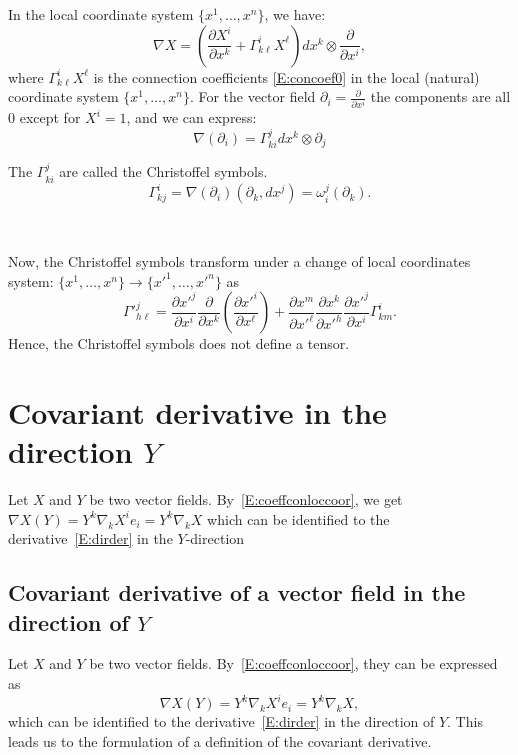In the  local coordinate system $\{x^{1},\dots,x^{n}\}$, we have:
\begin{equation}\label{E:coeffconloccoor}
\nabla X= \left( \frac{\partial X^{i} }{\partial x^{k}}+\Gamma^{i}_{k\ell}X^{\ell} \right) d x^{k} \otimes \frac{\partial}{\partial x^{i}},
\end{equation}
where  $\Gamma^{i}_{k\ell}X^{\ell}$ is the connection coefficients \eqref{E:concoef0} in the local (natural) coordinate system $\{x^{1},\dots,x^{n}\}$. For the vector field $ \partial_i=\frac{\partial}{\partial x^i}$ the components are all $0$ except for $X^i=1$, and we can express: 
\[
\nabla(\partial_i)= \Gamma^{j}_{ki} dx^k\otimes \partial_j
\]

\begin{definition}
The $\Gamma^{j}_{ki}$ are called the Christoffel symbols.
\begin{equation}
\Gamma^{i}_{kj} =
\nabla(\partial_{i})(\partial_{k},dx^{j})=\omega^{j}_{i}(\partial_{k}).
\end{equation}
\end{definition}

\,   

Now, the Christoffel symbols transform under a change of local coordinates system: $\{x^{1},\dots,x^{n}\}\to \{{x'}^{1},\dots,{x'}^{n}\}$ as
\begin{equation}
{\Gamma'}^{j}_{h\ell}= \frac{\partial{x'}^{j}}{\partial x^{i}}  \frac{\partial}{\partial x^{k}} \left(  \frac{\partial{x'}^{i}}{\partial x^{\ell}}\right) +     \frac{\partial x^{m}}{\partial {x'}^{\ell}} \frac{\partial x^{k}}{\partial{x'}^{h}} \frac{\partial{x'}^{j}}{\partial x^{i}} \Gamma^{i}_{k m}.
\end{equation}
Hence, the Christoffel symbols does not define a tensor.

\section{Covariant derivative  in the direction $Y$}
Let $X$ and $Y$ be two vector fields. By~\eqref{E:coeffconloccoor}, we get $\nabla X(Y)=Y^{k}\nabla_{k}X^{i}e_{i}=Y^{k} \nabla_{k}X$ which can be identified to the  derivative~\eqref{E:dirder} in the $Y$-direction  

\subsection{\bf Covariant derivative of a vector field in the direction of $Y$}
Let $X$ and $Y$ be two vector fields. By~\eqref{E:coeffconloccoor}, they can be expressed as $$\nabla X(Y)=Y^{k}\nabla_{k}X^{i}e_{i}=Y^{k} \nabla_{k}X,$$ which can be identified to the  derivative~\eqref{E:dirder} in the direction of $Y$.  This leads us to the formulation of a definition of the covariant derivative. 

